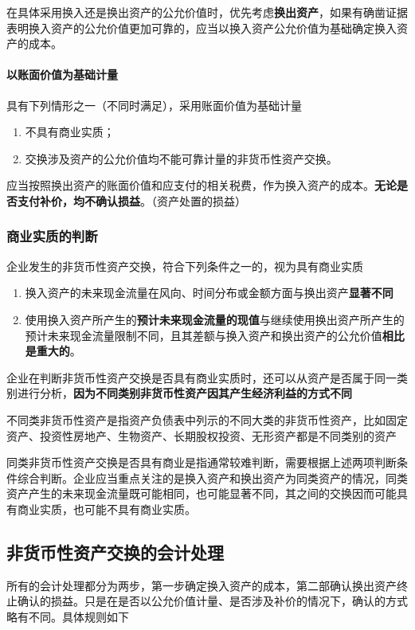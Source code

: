 \documentclass[UTF8,12pt]{ctexart}
\numberwithin{equation}{section} %
\numberwithin{figure}{section}
\numberwithin{table}{section}
\begin{document}
	在具体采用换入还是换出资产的公允价值时，优先考虑\textbf{换出资产}，如果有确凿证据表明换入资产的公允价值更加可靠的，应当以换入资产公允价值为基础确定换入资产的成本。
	
	\paragraph{以账面价值为基础计量}
	具有下列情形之一（不同时满足），采用账面价值为基础计量
	\begin{enumerate}
		\item 不具有商业实质；
		
		\item 交换涉及资产的公允价值均不能可靠计量的非货币性资产交换。
	\end{enumerate}
	
	应当按照换出资产的账面价值和应支付的相关税费，作为换入资产的成本。\textbf{无论是否支付补价，均不确认损益}。（资产处置的损益）
	
	\subsubsection{商业实质的判断}
	企业发生的非货币性资产交换，符合下列条件之一的，视为具有商业实质
	\begin{enumerate}
		\item 换入资产的未来现金流量在风向、时间分布或金额方面与换出资产\textbf{显著不同}
		
		\item 使用换入资产所产生的\textbf{预计未来现金流量的现值}与继续使用换出资产所产生的预计未来现金流量限制不同，且其差额与换入资产和换出资产的公允价值\textbf{相比是重大的}。
	\end{enumerate}
	
	企业在判断非货币性资产交换是否具有商业实质时，还可以从资产是否属于同一类别进行分析，\textbf{因为不同类别非货币性资产因其产生经济利益的方式不同}
	
	不同类非货币性资产是指资产负债表中列示的不同大类的非货币性资产，比如固定资产、投资性房地产、生物资产、长期股权投资、无形资产都是不同类别的资产
	
	同类非货币性资产交换是否具有商业是指通常较难判断，需要根据上述两项判断条件综合判断。企业应当重点关注的是换入资产和换出资产为同类资产的情况，同类资产产生的未来现金流量既可能相同，也可能显著不同，其之间的交换因而可能具有商业实质，也可能不具有商业实质。
	
	
	\subsection{非货币性资产交换的会计处理}
	所有的会计处理都分为两步，第一步确定换入资产的成本，第二部确认换出资产终止确认的损益。只是在是否以公允价值计量、是否涉及补价的情况下，确认的方式略有不同。具体规则如下
\end{document}
